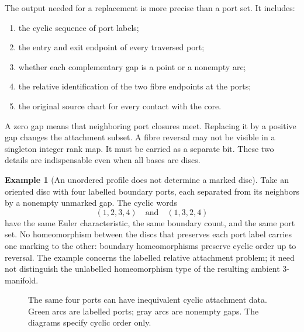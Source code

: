 \documentclass[11pt]{article}
\theoremstyle{definition}
\newtheorem{example}[theorem]{Example}
\theoremstyle{remark}
\begin{document}
The output needed for a replacement is more precise than a port set.
It includes:
\begin{enumerate}
\item the cyclic sequence of port labels;
\item the entry and exit endpoint of every traversed port;
\item whether each complementary gap is a point or a nonempty arc;
\item the relative identification of the two fibre endpoints at the ports;
\item the original source chart for every contact with the core.
\end{enumerate}

A zero gap means that neighboring port closures meet. Replacing it by a
positive gap changes the attachment subset. A fibre reversal may not be
visible in a singleton integer rank map. It must be carried as a separate
bit. These two details are indispensable even when all bases are discs.

\begin{example}[An unordered profile does not determine a marked disc]
Take an oriented disc with four labelled boundary ports, each separated
from its neighbors by a nonempty unmarked gap. The cyclic words
\[
(1,2,3,4)\quad\text{and}\quad(1,3,2,4)
\]
have the same Euler characteristic, the same boundary count, and the
same port set. No homeomorphism between the discs that preserves each
port label carries one marking to the other: boundary homeomorphisms
preserve cyclic order up to reversal. The example concerns the labelled
relative attachment problem; it need not distinguish the unlabelled
homeomorphism type of the resulting ambient 3-manifold.
\end{example}

\begin{figure}[ht]
\centering
{}
\caption{The same four ports can have inequivalent cyclic attachment
data. Green arcs are labelled ports; gray arcs are nonempty gaps.
The diagrams specify cyclic order only.}
\label{fig:ports}
\end{figure}
\end{document}
